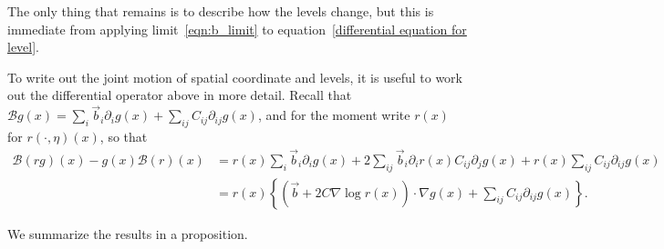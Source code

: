 \documentclass[12pt]{article}
\newcommand{\grad}{\nabla}
\newcommand{\DG}{\mathcal{B}}  %
\newcommand{\meanq}{\vec b}    %
\newcommand{\covq}{C}     %
\begin{document}
The only thing that remains is to describe how the levels change,
but this is immediate from applying limit~\eqref{eqn:b_limit}
to equation~\eqref{differential equation for level}.

To write out the joint motion of spatial coordinate and levels,
it is useful to work out the differential operator above in more detail.
Recall that $\DG g(x) = \sum_i \meanq_i \partial_i g(x) + \sum_{ij} \covq_{ij} \partial_{ij} g(x)$,
and for the moment write $r(x)$ for $r(\cdot, \eta)(x)$,
so that
\begin{align}
\DG(rg)(x) - g(x) \DG(r)(x)
    &= \nonumber
    r(x) \sum_i \meanq_i \partial_i g(x)
    + 2 \sum_{ij} \meanq_i \partial_i r(x) \covq_{ij} \partial_j g(x)
    + r(x) \sum_{ij} \covq_{ij} \partial_{ij} g(x) \\
    &= \label{eqn:limiting_generator}
    r(x) \left\{
        \left(
        \meanq
        + 2 \covq \grad \log r(x)
        \right)
        \cdot
        \grad g(x)
        +
        \sum_{ij} \covq_{ij} \partial_{ij} g(x)
    \right\} .
\end{align}


We summarize the results in a proposition.
\end{document}
